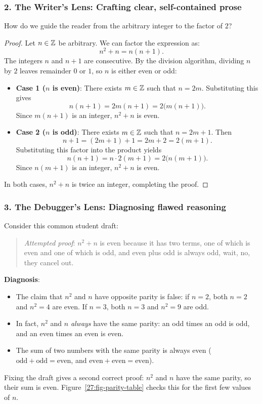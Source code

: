 \subsubsection{2. The Writer's Lens: Crafting clear, self-contained prose}
How do we guide the reader from the arbitrary integer to the factor of $2$?
\begin{proof}
Let $n \in \mathbb{Z}$ be arbitrary. We can factor the expression as:
\[
n^2 + n = n(n+1).
\]
The integers $n$ and $n+1$ are consecutive. By the division algorithm, dividing $n$ by $2$ leaves remainder $0$ or $1$, so $n$ is either even or odd:
\begin{itemize}
\item \textbf{Case 1 ($n$ is even)}: There exists $m \in \mathbb{Z}$ such that $n = 2m$. Substituting this gives
\[
n(n+1) = 2m(n+1) = 2\bigl(m(n+1)\bigr).
\]
Since $m(n+1)$ is an integer, $n^2 + n$ is even.
\item \textbf{Case 2 ($n$ is odd)}: There exists $m \in \mathbb{Z}$ such that $n = 2m + 1$. Then
\[
n + 1 = (2m + 1) + 1 = 2m + 2 = 2(m+1).
\]
Substituting this factor into the product yields
\[
n(n+1) = n \cdot 2(m+1) = 2\bigl(n(m+1)\bigr).
\]
Since $n(m+1)$ is an integer, $n^2 + n$ is even.
\end{itemize}
In both cases, $n^2 + n$ is twice an integer, completing the proof.
\end{proof}

\subsubsection{3. The Debugger's Lens: Diagnosing flawed reasoning}
Consider this common student draft:
\begin{quote}
\emph{Attempted proof}: $n^2 + n$ is even because it has two terms, one of which is even and one of which is odd, and even plus odd is always odd, wait, no, they cancel out.
\end{quote}
\textbf{Diagnosis}:
\begin{itemize}
\item The claim that $n^2$ and $n$ have opposite parity is false: if $n = 2$, both $n = 2$ and $n^2 = 4$ are even. If $n = 3$, both $n = 3$ and $n^2 = 9$ are odd.
\item In fact, $n^2$ and $n$ \emph{always} have the same parity: an odd times an odd is odd, and an even times an even is even.
\item The sum of two numbers with the same parity is always even ($\text{odd} + \text{odd} = \text{even}$, and $\text{even} + \text{even} = \text{even}$).
\end{itemize}
Fixing the draft gives a second correct proof: $n^2$ and $n$ have the same parity, so their sum is even. Figure~\ref{27:fig-parity-table} checks this for the first few values of $n$.

